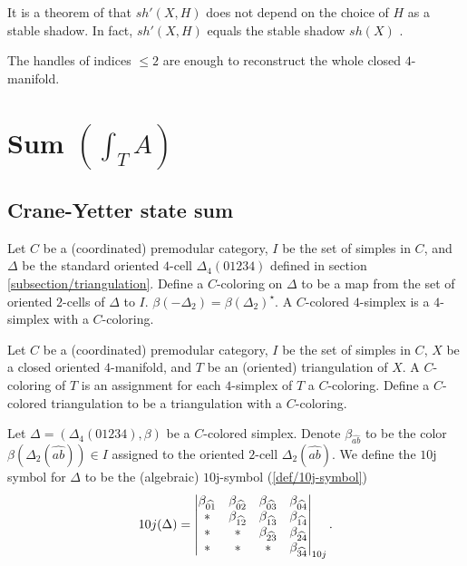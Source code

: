 \begin{remark}\label{remark/stable-shadow-of-a-4-manifold}
  It is a theorem of \cite[IX.4.2]{turaev-qiok-3-manifolds} that
  $sh'(X,H)$ does not depend on the choice of $H$ as a stable
  shadow. In fact, $sh'(X,H)$ equals the stable shadow $sh(X)$
  \cite[IX.7]{turaev-qiok-3-manifolds}.
\end{remark}

\begin{remark}\label{remark/reconstruction-of-4-manifolds}\cite[section 4.4]{gompf-stipsicz/4-manifolds-and-kirby-calculus}
  The handles of indices $\leq 2$ are enough to reconstruct the
  whole closed $4$-manifold.
\end{remark}

\section{Sum $\left( \int_{T}{A} \right)$}\label{section/sum}
\subsection{Crane-Yetter state sum}

\begin{definition}\label{def/C-colored-simplex}
  Let $C$ be a (coordinated) premodular category, $I$ be the set
  of simples in $C$, and $\Delta$ be the standard oriented
  $4$-cell $\Delta_{4}(01234)$ defined in section
  \ref{subsection/triangulation}. Define a $C$-coloring on
  $\Delta$ to be a map from the set of oriented $2$-cells of
  $\Delta$ to $I$.
  $\beta(-\Delta_{2}) = \beta(\Delta_{2})^{\star}$. A $C$-colored
  $4$-simplex is a $4$-simplex with a $C$-coloring.
\end{definition}

\begin{definition}\label{def/C-colored-triangulation}
  Let $C$ be a (coordinated) premodular category, $I$ be the set
  of simples in $C$, $X$ be a closed oriented $4$-manifold, and
  $T$ be an (oriented) triangulation of $X$. A $C$-coloring of
  $T$ is an assignment for each $4$-simplex of $T$ a
  $C$-coloring. Define a $C$-colored triangulation to be a
  triangulation with a $C$-coloring.
\end{definition}

\begin{definition}\label{def/10j-symbol-for-a-C-colored-simplex}
  Let $\Delta = (\Delta_{4}(01234), \beta)$ be a $C$-colored
  simplex. Denote $\beta_{\widehat{ab}}$ to be the color
  $\beta(\Delta_{2}(\widehat{ab})) \in I$ assigned to the
  oriented $2$-cell $\Delta_{2}(\widehat{ab})$. We define the
  $10$j symbol for $\Delta$ to be the (algebraic) $10$j-symbol
  (\ref{def/10j-symbol})
  $$
  10j(\Delta) =
  \begin{vmatrix} \beta_{\widehat{01}} & \beta_{\widehat{02}} & \beta_{\widehat{03}} & \beta_{\widehat{04}} \\ * & \beta_{\widehat{12}} & \beta_{\widehat{13}} & \beta_{\widehat{14}} \\ * & * & \beta_{\widehat{23}} & \beta_{\widehat{24}} \\ * & * & * & \beta_{\widehat{34}} \\ \end{vmatrix}_{10j}.
  $$
\end{definition}

